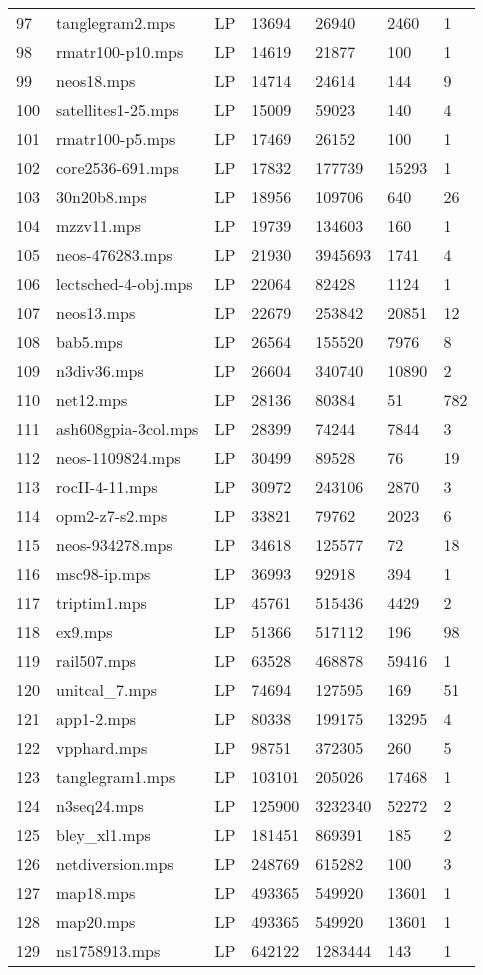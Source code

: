 \documentclass{article}
\begin{document}
\begin{longtable}{|l |l |l |l |l |l |l |}
97&tanglegram2.mps&LP&13694&26940&2460&1\\
98&rmatr100-p10.mps&LP&14619&21877&100&1\\
99&neos18.mps&LP&14714&24614&144&9\\
100&satellites1-25.mps&LP&15009&59023&140&4\\
101&rmatr100-p5.mps&LP&17469&26152&100&1\\
102&core2536-691.mps&LP&17832&177739&15293&1\\
103&30n20b8.mps&LP&18956&109706&640&26\\
104&mzzv11.mps&LP&19739&134603&160&1\\
105&neos-476283.mps&LP&21930&3945693&1741&4\\
106&lectsched-4-obj.mps&LP&22064&82428&1124&1\\
107&neos13.mps&LP&22679&253842&20851&12\\
108&bab5.mps&LP&26564&155520&7976&8\\
109&n3div36.mps&LP&26604&340740&10890&2\\
110&net12.mps&LP&28136&80384&51&782\\
111&ash608gpia-3col.mps&LP&28399&74244&7844&3\\
112&neos-1109824.mps&LP&30499&89528&76&19\\
113&rocII-4-11.mps&LP&30972&243106&2870&3\\
114&opm2-z7-s2.mps&LP&33821&79762&2023&6\\
115&neos-934278.mps&LP&34618&125577&72&18\\
116&msc98-ip.mps&LP&36993&92918&394&1\\
117&triptim1.mps&LP&45761&515436&4429&2\\
118&ex9.mps&LP&51366&517112&196&98\\
119&rail507.mps&LP&63528&468878&59416&1\\
120&unitcal_7.mps&LP&74694&127595&169&51\\
121&app1-2.mps&LP&80338&199175&13295&4\\
122&vpphard.mps&LP&98751&372305&260&5\\
123&tanglegram1.mps&LP&103101&205026&17468&1\\
124&n3seq24.mps&LP&125900&3232340&52272&2\\
125&bley_xl1.mps&LP&181451&869391&185&2\\
126&netdiversion.mps&LP&248769&615282&100&3\\
127&map18.mps&LP&493365&549920&13601&1\\
128&map20.mps&LP&493365&549920&13601&1\\
129&ns1758913.mps&LP&642122&1283444&143&1\\
\hline
\end{longtable}
\end{document}
